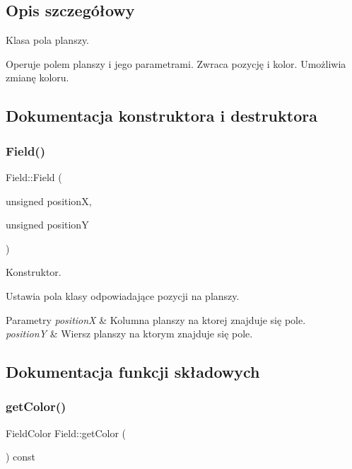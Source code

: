 \subsection{Opis szczegółowy}
Klasa pola planszy. 

Operuje polem planszy i jego parametrami. Zwraca pozycję i kolor. Umożliwia zmianę koloru. 

\subsection{Dokumentacja konstruktora i destruktora}
\mbox{\label{class_field_a1eb907c779de02177fc9d519cf7089e3}} 
\subsubsection{Field()}
{\footnotesize\ttfamily Field\+::\+Field (\begin{DoxyParamCaption}\item[{unsigned}]{positionX,  }\item[{unsigned}]{positionY }\end{DoxyParamCaption})\hspace{0.3cm}{\ttfamily [inline]}}



Konstruktor. 

Ustawia pola klasy odpowiadające pozycji na planszy. 
\begin{DoxyParams}{Parametry}
{\em positionX} & Kolumna planszy na ktorej znajduje się pole. \\
\hline
{\em positionY} & Wiersz planszy na ktorym znajduje się pole. \\
\hline
\end{DoxyParams}


\subsection{Dokumentacja funkcji składowych}
\mbox{\label{class_field_a7c6849feccff982e3b135921a81ece07}} 
\subsubsection{getColor()}
{\footnotesize\ttfamily Field\+Color Field\+::get\+Color (\begin{DoxyParamCaption}{ }\end{DoxyParamCaption}) const}



